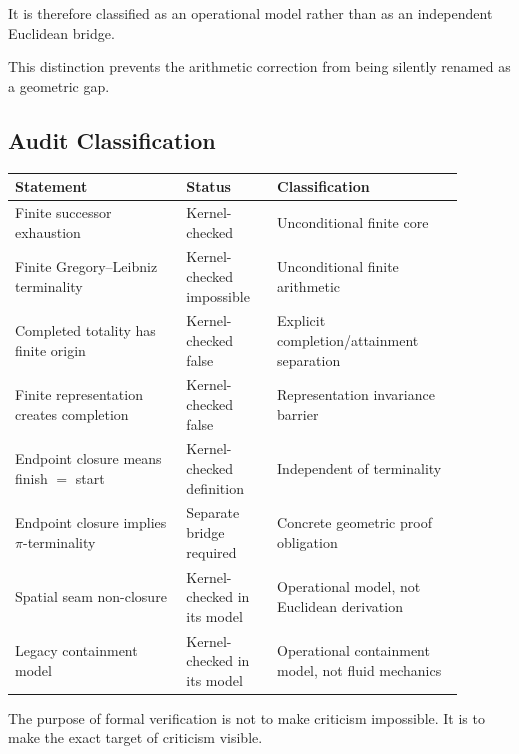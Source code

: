 \documentclass[11pt,a4paper]{article}
\begin{document}
It is therefore classified as an operational model rather than as an
independent Euclidean bridge.

This distinction prevents the arithmetic correction from being
silently renamed as a geometric gap.

\subsection*{Audit Classification}

\begin{center}
\small
\begin{tabular}{p{0.34\linewidth} p{0.18\linewidth} p{0.37\linewidth}}
\toprule
\textbf{Statement} &
\textbf{Status} &
\textbf{Classification} \\
\midrule

Finite successor exhaustion &
Kernel-checked &
Unconditional finite core \\[3pt]

Finite Gregory--Leibniz terminality &
Kernel-checked impossible &
Unconditional finite arithmetic \\[3pt]

Completed totality has finite origin &
Kernel-checked false &
Explicit completion/attainment separation \\[3pt]

Finite representation creates completion &
Kernel-checked false &
Representation invariance barrier \\[3pt]

Endpoint closure means finish \(=\) start &
Kernel-checked definition &
Independent of terminality \\[3pt]

Endpoint closure implies \(\pi\)-terminality &
Separate bridge required &
Concrete geometric proof obligation \\[3pt]

Spatial seam non-closure &
Kernel-checked in its model &
Operational model, not Euclidean derivation \\[3pt]

Legacy containment model &
Kernel-checked in its model &
Operational containment model, not fluid mechanics \\
\bottomrule
\end{tabular}
\end{center}

The purpose of formal verification is not to make criticism impossible.
It is to make the exact target of criticism visible.
\end{document}
